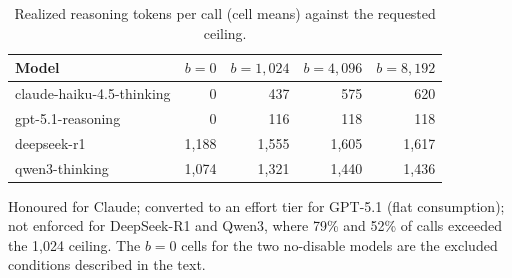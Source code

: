 \begin{table}[!t]
\centering
\caption{Realized reasoning tokens per call (cell means) against the requested ceiling.}
\label{tab:tokens}
\footnotesize
\setlength{\tabcolsep}{4pt}
\begin{tabular}{lrrrr}
\hline
Model & $b=0$ & $b=1{,}024$ & $b=4{,}096$ & $b=8{,}192$ \\
\hline
claude-haiku-4.5-thinking & 0 & 437 & 575 & 620 \\
gpt-5.1-reasoning & 0 & 116 & 118 & 118 \\
deepseek-r1 & 1,188 & 1,555 & 1,605 & 1,617 \\
qwen3-thinking & 1,074 & 1,321 & 1,440 & 1,436 \\
\hline
\end{tabular}
\par\smallskip\footnotesize Honoured for Claude; converted to an effort tier for GPT-5.1 (flat consumption); not enforced for DeepSeek-R1 and Qwen3, where 79\% and 52\% of calls exceeded the 1,024 ceiling. The $b=0$ cells for the two no-disable models are the excluded conditions described in the text.
\end{table}
